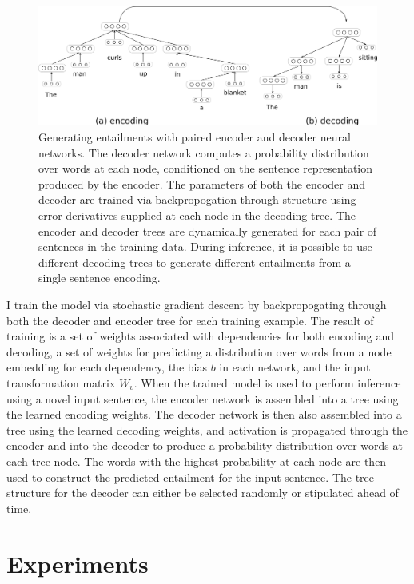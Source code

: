 \begin{figure}[t]
\begin{center}
\includegraphics[width=5.5in]{figures/decoder.png}
\end{center}
\caption{Generating entailments with paired encoder and decoder neural networks. The decoder network computes a probability distribution over words at each node, conditioned on the sentence representation produced by the encoder. The parameters of both the encoder and decoder are trained via backpropogation through structure using error derivatives supplied at each node in the decoding tree. The encoder and decoder trees are dynamically generated for each pair of sentences in the training data. During inference, it is possible to use different decoding trees to generate different entailments from a single sentence encoding.} 
\label{decoder}
\end{figure}

I train the model via stochastic gradient descent by backpropogating through both the decoder and encoder tree for each training example. The result of training is a set of weights associated with dependencies for both encoding and decoding, a set of weights for predicting a distribution over words from a node embedding for each dependency, the bias $b$ in each network, and the input transformation matrix $W_v$. When the trained model is used to perform inference using a novel input sentence, the encoder network is assembled into a tree using the learned encoding weights. The decoder network is then also assembled into a tree using the learned decoding weights, and activation is propagated through the encoder and into the decoder to produce a probability distribution over words at each tree node. The words with the highest probability at each node are then used to construct the predicted entailment for the input sentence. The tree structure for the decoder can either be selected randomly or stipulated ahead of time. 

\section{Experiments}

